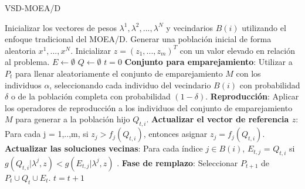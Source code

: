 \begin{algorithm}[H]
\caption{VSD-MOEA/D}
\label{alg:VSD_MOEAD}
\begin{scriptsize}
\begin{algorithmic}[1]
    \STATE Inicializar los vectores de pesos $\lambda^1, \lambda^2, ..., \lambda^N$ y vecindarios $B(i)$ utilizando el enfoque tradicional del MOEA/D. \label{alg:Inicializacion_VSD_MOEAD}
    \STATE Generar una población inicial de forma aleatoria $x^1, ..., x^N$. \label{alg:generar_poblacion_MOEAD}
    \STATE Inicializar $z = (z_1, ..., z_m)^T$ con un valor elevado en relación al problema. \label{alg:Inicializar_Referencia_MOEAD}
    \STATE $E \leftarrow \emptyset$
    \STATE $Q \leftarrow \emptyset$
    \STATE $t = 0$
   \label{alg:iniciagen}
    \STATE \textbf{Conjunto para emparejamiento}: Utilizar a $P_t$ para llenar aleatoriamente el conjunto de emparejamiento $M$ con los individuos $\alpha$, seleccionando cada individuo del vecindario $B(i)$ con probabilidad $\delta$ o de la población completa con probabilidad $(1 - \delta)$. \label{alg:Emparejamiento_MOEAD}
    \STATE \textbf{Reproducción}: Aplicar los operadores de reproducción a los individuos del conjunto de emparejamiento $M$ para generar a la población hijo $Q_{t,i}$. \label{alg:reproduccion_MOEAD}
    \STATE \textbf{Actualizar el vector de referencia $z$}: Para cada j = 1,..,m, si $z_j > f_j(Q_{t,i})$, entonces asignar $z_j = f_j(Q_{t,i})$.
    \STATE \textbf{Actualizar las soluciones vecinas}: Para cada índice $j \in B(i)$, $E_{t,j}$ = $Q_{t,i}$ si $g( Q_{t,i}| \lambda^j, z) < g(E_{t,j} | \lambda^j, z)$  \label{alg:actualizar_elite_MOEAD}.
    \ENDFOR
    \STATE \textbf{Fase de remplazo}: Seleccionar $P_{t+1}$ de $P_t \cup Q_t \cup E_t$. \label{alg:remplazo_MOEAD}
    \STATE $t = t + 1$
  \ENDWHILE \label{alg:terminagen}
\end{algorithmic}
\end{scriptsize}
\end{algorithm}



